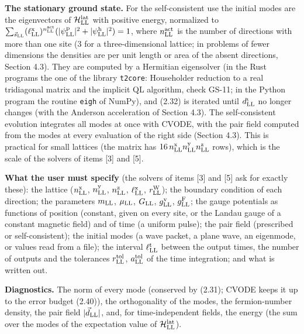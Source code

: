 \documentclass[
  10pt,
]{article}
\begin{document}
\textbf{The stationary ground state.} For the self-consistent use the
initial modes are the eigenvectors of \(\mathcal H^{\rm lat}_{\rm LL}\)
with positive energy, normalized to
\(\sum_{\vec s_{\rm LL}}(\ell^{\rm x}_{\rm LL})^{n^{\rm act}_{\rm LL}}(\lvert\psi^{\rm p}_{\rm LL}\rvert^2+\lvert\psi^{\rm h}_{\rm LL}\rvert^2)=1\),
where \(n^{\rm act}_{\rm LL}\) is the number of directions with more
than one site (3 for a three-dimensional lattice; in problems of fewer
dimensions the densities are per unit length or area of the absent
directions, Section 4.3). They are computed by a Hermitian eigensolver
(in the Rust programs the one of the library \texttt{t2core}:
Householder reduction to a real tridiagonal matrix and the implicit QL
algorithm, check GS-11; in the Python program the routine \texttt{eigh}
of NumPy), and (2.32) is iterated until \(d^\iota_{\rm LL}\) no longer
changes (with the Anderson acceleration of Section 4.3). The
self-consistent evolution integrates all modes at once with CVODE, with
the pair field computed from the modes at every evaluation of the right
side (Section 4.3). This is practical for small lattices (the matrix has
\(16\,n^{\rm x}_{\rm LL}n^{\rm y}_{\rm LL}n^{\rm z}_{\rm LL}\) rows),
which is the scale of the solvers of items {[}3{]} and {[}5{]}.

\textbf{What the user must specify} (the solvers of items {[}3{]} and
{[}5{]} ask for exactly these): the lattice (\(n^{\rm x}_{\rm LL}\),
\(n^{\rm y}_{\rm LL}\), \(n^{\rm z}_{\rm LL}\),
\(\ell^{\rm x}_{\rm LL}\), \(r^{\rm W}_{\rm LL}\)); the boundary
condition of each direction; the parameters \(m_{\rm LL}\),
\(\mu_{\rm LL}\), \(G_{\rm LL}\), \(g^{\rm v}_{\rm LL}\),
\(g^{\rm F}_{\rm LL}\); the gauge potentials as functions of position
(constant, given on every site, or the Landau gauge of a constant
magnetic field) and of time (a uniform pulse); the pair field
(prescribed or self-consistent); the initial modes (a wave packet, a
plane wave, an eigenmode, or values read from a file); the interval
\(\ell^{\rm t}_{\rm LL}\) between the output times, the number of
outputs and the tolerances \(r^{\rm tol}_{\rm LL}\),
\(a^{\rm tol}_{\rm LL}\) of the time integration; and what is written
out.

\textbf{Diagnostics.} The norm of every mode (conserved by (2.31); CVODE
keeps it up to the error budget (2.40)), the orthogonality of the modes,
the fermion-number density, the pair field
\(\lvert\vec d_{\rm LL}\rvert\), and, for time-independent fields, the
energy (the sum over the modes of the expectation value of
\(\mathcal H^{\rm lat}_{\rm LL}\)).
\end{document}
